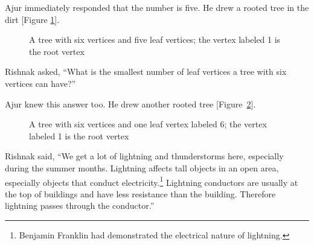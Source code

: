 Ajur immediately responded that the number is five.  He drew a rooted tree in the dirt [Figure \ref{t1}].

\begin{figure}
\begin{center}
\caption{A tree with six vertices and five leaf vertices; the vertex labeled 1 is the root vertex}\label{t1}
\end{center}
\end{figure}

Rishnak asked, ``What is the smallest number of leaf vertices a tree with six vertices can have?''

Ajur knew this answer too. He drew another rooted tree [Figure~\ref{t2}].

\begin{figure}
\begin{center}

\caption{A tree with six vertices and one leaf vertex labeled 6; the vertex labeled 1 is the root vertex}\label{t2}
\end{center}
\end{figure}

Rishnak said, ``We get a lot of lightning and thunderstorms here, especially during the summer months. Lightning affects tall objects in an open area, especially objects that conduct electricity.\footnote{Benjamin Franklin had demonstrated the electrical nature of lightning.} Lightning conductors are usually at the top of buildings and have less resistance than the building. Therefore lightning passes through the conductor.''

